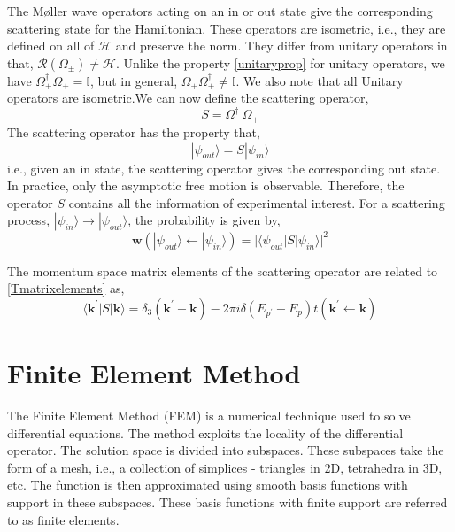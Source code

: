 \documentclass[a4paper,10pt]{report}
\begin{document}
The Møller wave operators acting on an in or out state give the corresponding scattering state
for the Hamiltonian. These operators are isometric, i.e., they are defined on all of $\mathcal{H}$
and preserve the norm. They differ from unitary operators in that, $\mathcal{R}\left(\Omega_\pm\right)\neq\mathcal{H}$.
Unlike the property \eqref{unitaryprop} for unitary operators, we have $\Omega_\pm^\dagger\Omega_\pm=\mathbb{I}$, but
in general, $\Omega_\pm\Omega^\dagger_\pm\neq\mathbb{I}$. We also note that all Unitary operators are isometric.We 
can now define the scattering operator,
\begin{equation}\label{scatteringopdef}
 S=\Omega_-^\dagger\Omega_+
\end{equation}
The scattering operator has the property that,
\begin{equation}\label{scatterinprop}
 |\psi_{out}\rangle = S|\psi_{in}\rangle
\end{equation}
i.e., given an in state, the scattering operator gives the corresponding out state. In practice, only the asymptotic free motion 
is observable. Therefore, the operator $S$ contains all the information of experimental interest. For a scattering process,
$|\psi_{in}\rangle\rightarrow|\psi_{out}\rangle$, the probability is given by,
\begin{equation}\label{scatteringprob}
 \mathbf{w}(|\psi_{out}\rangle\leftarrow|\psi_{in}\rangle)=\lvert\langle\psi_{out}\rvert S\lvert\psi_{in}\rangle\rvert^2
\end{equation}

The momentum space matrix elements of the scattering operator are related to \eqref{Tmatrixelements} as,
\begin{equation}\label{Smatrixelements}
 \langle \mathbf{k}^\prime |S| \mathbf{k} \rangle = \delta_3(\mathbf{k}^\prime - \mathbf{k})-2\pi i\delta\left(E_{p^\prime}-E_p\right)t\left(\mathbf{k}^\prime\leftarrow\mathbf{k}\right)
\end{equation}

\section{Finite Element Method}
The Finite Element Method (FEM) is a numerical technique used to solve differential equations.
The method exploits the locality of the differential operator. The solution space is divided into
subspaces. These subspaces take the form of a mesh, i.e., a collection of simplices - triangles
in 2D, tetrahedra in 3D, etc. The function is then approximated using smooth basis functions with support in these subspaces.
These basis functions with finite support are referred to as finite elements.
\end{document}
